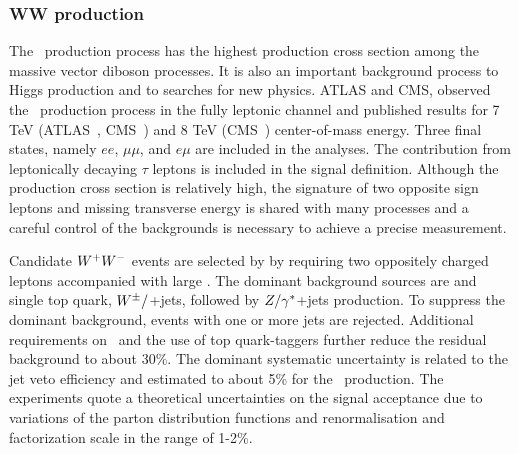 \subsubsection{WW production}
\label{sss-WWprod}

The \WW\ production process has the highest production cross section
among the massive vector diboson processes. It is also an important
background process to Higgs production and to searches for new physics.
ATLAS and CMS, observed the \WW\ production process in 
the fully leptonic channel and published results for 7 TeV 
(ATLAS~\cite{ATLAS:2012mec}, CMS~\cite{Chatrchyan:2013yaa}) and
8 TeV (CMS~\cite{Chatrchyan:2013oev}) center-of-mass energy. 
Three final states, namely $ee$, $\mu\mu$, and $e\mu$ are included in the analyses. 
The contribution from leptonically decaying $\tau$ leptons is included in the signal
definition. Although the production cross section is relatively high, the signature of two opposite 
sign leptons and missing transverse energy is shared with many processes and a careful
control of the backgrounds is necessary to achieve a precise measurement.


Candidate $W^+W^-$ events are selected by by requiring two oppositely charged leptons 
accompanied with large \MET. 
The dominant background sources are \ttbar\; and single top quark, 
$W^{\pm}/$+jets, followed by $Z/\gamma^{*}$+jets production.
To suppress the dominant \ttbar\; background, events with one or more jets are rejected.   
Additional requirements on \MET\ and the use of top quark-taggers further reduce the residual background
to about 30\%.  
The dominant systematic uncertainty is related to the jet veto efficiency 
and estimated to about 5\% for the \WW\, production. 
The experiments quote a theoretical uncertainties on the signal acceptance due to 
variations of the parton distribution functions and renormalisation and factorization 
scale in the range of 1-2\%.


